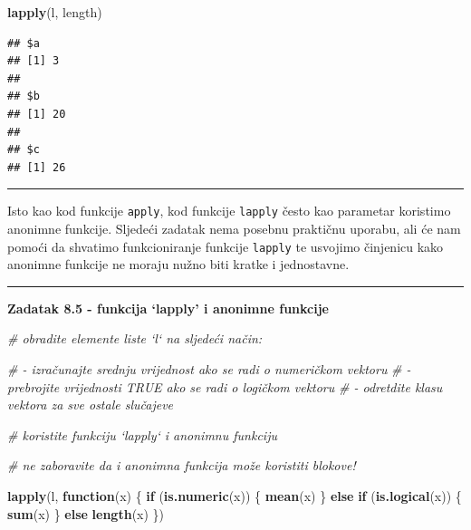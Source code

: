 \documentclass[]{book}
\newenvironment{Shaded}{\begin{snugshade}}{\end{snugshade}}
\newcommand{\KeywordTok}[1]{\textcolor[rgb]{0.13,0.29,0.53}{\textbf{#1}}}
\newcommand{\CommentTok}[1]{\textcolor[rgb]{0.56,0.35,0.01}{\textit{#1}}}
\newcommand{\ControlFlowTok}[1]{\textcolor[rgb]{0.13,0.29,0.53}{\textbf{#1}}}
\newcommand{\NormalTok}[1]{#1}
\theoremstyle{definition}
\theoremstyle{definition}
\theoremstyle{definition}
\theoremstyle{remark}
\begin{document}
\begin{Shaded}
\begin{Highlighting}[]
\KeywordTok{lapply}\NormalTok{(l, length)}
\end{Highlighting}
\end{Shaded}

\begin{verbatim}
## $a
## [1] 3
## 
## $b
## [1] 20
## 
## $c
## [1] 26
\end{verbatim}

\begin{center}\rule{0.5\linewidth}{\linethickness}\end{center}

Isto kao kod funkcije \texttt{apply}, kod funkcije \texttt{lapply} često
kao parametar koristimo anonimne funkcije. Sljedeći zadatak nema posebnu
praktičnu uporabu, ali će nam pomoći da shvatimo funkcioniranje funkcije
\texttt{lapply} te usvojimo činjenicu kako anonimne funkcije ne moraju
nužno biti kratke i jednostavne.

\begin{center}\rule{0.5\linewidth}{\linethickness}\end{center}

\textbf{Zadatak 8.5 - funkcija `lapply' i anonimne funkcije}

\begin{Shaded}
\begin{Highlighting}[]
\CommentTok{# obradite elemente liste `l` na sljedeći način:}

\CommentTok{# - izračunajte srednju vrijednost ako se radi o numeričkom vektoru}
\CommentTok{# - prebrojite vrijednosti TRUE ako se radi o logičkom vektoru}
\CommentTok{# - odretdite klasu vektora za sve ostale slučajeve}

\CommentTok{# koristite funkciju `lapply` i anonimnu funkciju}

\CommentTok{# ne zaboravite da i anonimna funkcija može koristiti blokove!}
\end{Highlighting}
\end{Shaded}

\begin{Shaded}
\begin{Highlighting}[]
\KeywordTok{lapply}\NormalTok{(l, }\ControlFlowTok{function}\NormalTok{(x) \{}
    \ControlFlowTok{if}\NormalTok{ (}\KeywordTok{is.numeric}\NormalTok{(x)) \{}
        \KeywordTok{mean}\NormalTok{(x)}
\NormalTok{    \} }\ControlFlowTok{else} \ControlFlowTok{if}\NormalTok{ (}\KeywordTok{is.logical}\NormalTok{(x)) \{}
        \KeywordTok{sum}\NormalTok{(x)}
\NormalTok{    \} }\ControlFlowTok{else} \KeywordTok{length}\NormalTok{(x)}
\NormalTok{\})}
\end{Highlighting}
\end{Shaded}
\end{document}
